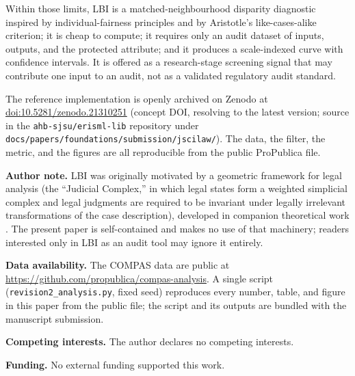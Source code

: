 \documentclass[11pt]{article}
\begin{document}
Within those limits, LBI is a matched-neighbourhood disparity
diagnostic inspired by individual-fairness principles and by
Aristotle's like-cases-alike criterion; it is cheap to compute; it
requires only an audit dataset of inputs, outputs, and the protected
attribute; and it produces a scale-indexed curve with confidence
intervals. It is offered as a research-stage screening signal that
may contribute one input to an audit, not as a validated regulatory
audit standard.

The reference implementation is openly archived on Zenodo at
\href{https://doi.org/10.5281/zenodo.21310251}{doi:10.5281/zenodo.21310251}
(concept DOI, resolving to the latest version; source in the
\texttt{ahb-sjsu/erisml-lib} repository under
\texttt{docs/papers/foundations/submission/jscilaw/}). The data, the
filter, the metric, and the figures are all reproducible from the public
ProPublica file.

\bigskip
\noindent\textbf{Author note.} LBI was originally motivated by a
geometric framework for legal analysis (the ``Judicial Complex,''
in which legal states form a weighted simplicial complex and legal
judgments are required to be invariant under legally irrelevant
transformations of the case description), developed in companion
theoretical work \citep{bond2026geometric,bond2026tractability}. The
present paper is self-contained and makes no use of that machinery;
readers interested only in LBI as an audit tool may ignore it
entirely.

\bigskip
\noindent\textbf{Data availability.} The COMPAS data are public at
\url{https://github.com/propublica/compas-analysis}. A single script
(\texttt{revision2\_analysis.py}, fixed seed) reproduces every
number, table, and figure in this paper from the public file; the
script and its outputs are bundled with the manuscript submission.

\bigskip
\noindent\textbf{Competing interests.} The author declares no
competing interests.

\bigskip
\noindent\textbf{Funding.} No external funding supported this work.
\end{document}
